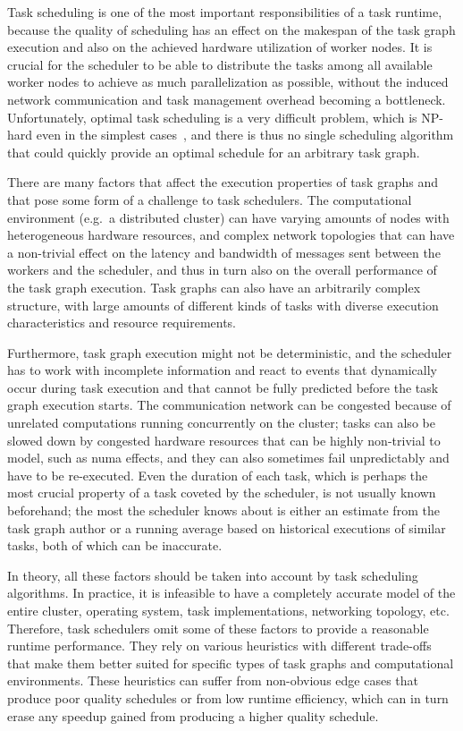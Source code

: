 Task scheduling is one of the most important responsibilities of a task runtime, because the
quality of scheduling has an effect on the makespan of the task graph execution and also on the
achieved hardware utilization of worker nodes. It is crucial for the scheduler to be able to
distribute the tasks among all available worker nodes to achieve as much parallelization as
possible, without the induced network communication and task management overhead becoming a
bottleneck. Unfortunately, optimal task scheduling is a very difficult problem, which is NP-hard
even in the simplest cases~\cite{Ullman1975}, and there is thus no single scheduling algorithm
that could quickly provide an optimal schedule for an arbitrary task graph.

There are many factors that affect the execution properties of task graphs and that pose some form
of a challenge to task schedulers. The computational environment (e.g.\ a distributed cluster) can
have varying amounts of nodes with heterogeneous hardware resources, and complex network topologies
that can have a non-trivial effect on the latency and bandwidth of messages sent between the
workers and the scheduler, and thus in turn also on the overall performance of the task graph
execution. Task graphs can also have an arbitrarily complex structure, with large amounts of
different kinds of tasks with diverse execution characteristics and resource requirements.

Furthermore, task graph execution might not be deterministic, and the scheduler has to work with
incomplete information and react to events that dynamically occur during task execution and that
cannot be fully predicted before the task graph execution starts. The communication network can be
congested because of unrelated computations running concurrently on the cluster; tasks can also be
slowed down by congested hardware resources that can be highly non-trivial to model, such as
\gls{numa} effects, and they can also sometimes fail unpredictably and have to be
re-executed. Even the duration of each task, which is perhaps the most crucial property of a task
coveted by the scheduler, is not usually known beforehand; the most the scheduler knows about is
either an estimate from the task graph author or a running average based on historical executions
of similar tasks, both of which can be inaccurate.

In theory, all these factors should be taken into account by task scheduling algorithms. In
practice, it is infeasible to have a completely accurate model of the entire cluster, operating
system, task implementations, networking topology, etc. Therefore, task schedulers omit some of
these factors to provide a reasonable runtime performance. They rely on various heuristics with
different trade-offs that make them better suited for specific types of task graphs and
computational environments. These heuristics can suffer from non-obvious edge cases that produce
poor quality schedules or from low runtime efficiency, which can in turn erase any speedup gained
from producing a higher quality schedule.

